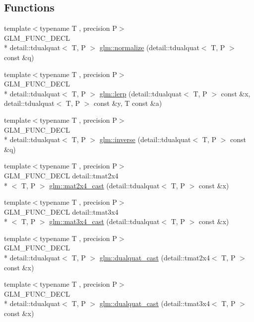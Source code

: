 \subsection*{Functions}
\begin{DoxyCompactItemize}
\item 
{\footnotesize template$<$typename T , precision P$>$ }\\G\-L\-M\-\_\-\-F\-U\-N\-C\-\_\-\-D\-E\-C\-L \\*
detail\-::tdualquat$<$ T, P $>$ \hyperlink{group__gtc__dual__quaternion_ga4364d115fe8ee2f65ff047726133d0ad}{glm\-::normalize} (detail\-::tdualquat$<$ T, P $>$ const \&q)
\item 
{\footnotesize template$<$typename T , precision P$>$ }\\G\-L\-M\-\_\-\-F\-U\-N\-C\-\_\-\-D\-E\-C\-L \\*
detail\-::tdualquat$<$ T, P $>$ \hyperlink{group__gtc__dual__quaternion_ga28cbcf029272d5351d4695b8610de126}{glm\-::lerp} (detail\-::tdualquat$<$ T, P $>$ const \&x, detail\-::tdualquat$<$ T, P $>$ const \&y, T const \&a)
\item 
{\footnotesize template$<$typename T , precision P$>$ }\\G\-L\-M\-\_\-\-F\-U\-N\-C\-\_\-\-D\-E\-C\-L \\*
detail\-::tdualquat$<$ T, P $>$ \hyperlink{group__gtc__dual__quaternion_gaad6b9faeb1134c04defae01426a777f8}{glm\-::inverse} (detail\-::tdualquat$<$ T, P $>$ const \&q)
\item 
{\footnotesize template$<$typename T , precision P$>$ }\\G\-L\-M\-\_\-\-F\-U\-N\-C\-\_\-\-D\-E\-C\-L detail\-::tmat2x4\\*
$<$ T, P $>$ \hyperlink{group__gtc__dual__quaternion_gade155fb0dfc144259a25897776e73325}{glm\-::mat2x4\-\_\-cast} (detail\-::tdualquat$<$ T, P $>$ const \&x)
\item 
{\footnotesize template$<$typename T , precision P$>$ }\\G\-L\-M\-\_\-\-F\-U\-N\-C\-\_\-\-D\-E\-C\-L detail\-::tmat3x4\\*
$<$ T, P $>$ \hyperlink{group__gtc__dual__quaternion_ga2f4f0a1275fa95c272dd6ad6df75013d}{glm\-::mat3x4\-\_\-cast} (detail\-::tdualquat$<$ T, P $>$ const \&x)
\item 
{\footnotesize template$<$typename T , precision P$>$ }\\G\-L\-M\-\_\-\-F\-U\-N\-C\-\_\-\-D\-E\-C\-L \\*
detail\-::tdualquat$<$ T, P $>$ \hyperlink{group__gtc__dual__quaternion_gad47c752ec23a5f9924e7d7f84c40f3e5}{glm\-::dualquat\-\_\-cast} (detail\-::tmat2x4$<$ T, P $>$ const \&x)
\item 
{\footnotesize template$<$typename T , precision P$>$ }\\G\-L\-M\-\_\-\-F\-U\-N\-C\-\_\-\-D\-E\-C\-L \\*
detail\-::tdualquat$<$ T, P $>$ \hyperlink{group__gtc__dual__quaternion_ga97c4fb8941ad1954e01578cca8182180}{glm\-::dualquat\-\_\-cast} (detail\-::tmat3x4$<$ T, P $>$ const \&x)
\end{DoxyCompactItemize}


